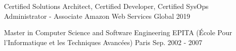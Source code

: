
\begin{cventries}

  \cventry
    {Certified Solutions Architect, Certified Developer, Certified SysOps Administrator - Associate} %
    {Amazon Web Services} %
    {Global} %
    {2019} %
    {} %
    \vspace{-0.4cm}

  \cventry
    {Master in Computer Science and Software Engineering} %
    {EPITA (École Pour l'Informatique et les Techniques Avancées)} %
    {Paris} %
    {Sep. 2002 - 2007} %
    {} %
    \vspace{-0.4cm}

\end{cventries}
